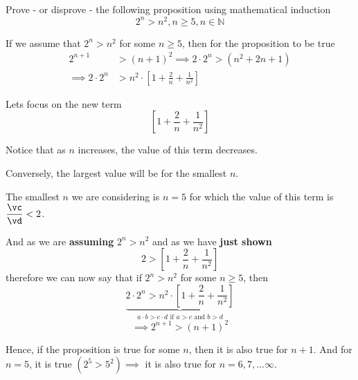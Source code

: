 
\question[3] Prove - or disprove - the following proposition using mathematical induction 
\[ 2^n > n^2, n\geq 5, n\in\mathbb{N} \]

\insertQR{}

\va\vb
\FRACADD\va{}\vc\vd

\begin{solution}[\halfpage]
  If we assume that  $2^n > n^2$ for some $n\geq 5$, then for the proposition to be true
  \begin{align}
    2^{n+1} &> (n+1)^2\implies 2\cdot 2^n > (n^2 + 2n + 1) \\
    \implies 2\cdot 2^n &> n^2\cdot\left[ 1 + \frac{2}{n} + \frac{1}{n^2} \right]
  \end{align}

  Lets focus on the new term 
  \[\left[ 1+\frac{2}{n}+\frac{1}{n^2} \right]\]

  Notice that as $n$ increases, the value of this term decreases. 

  Conversely, the largest value will be for the smallest $n$. 

  The smallest $n$ we are considering is $n=5$ for which the value of 
  this term is $\dfrac\vc\vd < 2$.

  And as we are \textbf{assuming} $2^n > n^2$ and as we have \textbf{just shown}
  \[ 2 > \left[ 1 + \frac{2}{n} + \frac{1}{n^2} \right] \]
  therefore we can now say that if $2^n > n^2$ for some $n\geq 5$, then
  \[ \underbrace{2\cdot 2^n > n^2\cdot\left[ 1 + \frac{2}{n} + \frac{1}{n^2} \right]}
  _{a\cdot b > c\cdot d\text{ if } a > c\text{ and } b > d }\]
  \[\implies 2^{n+1} > (n+1)^2\]

  Hence, if the proposition is true for some $n$, then it is also true for $n+1$. 
  And for $n=5$, it is true $(2^5>5^2)\implies$ it is also true for $n=6,7,\ldots\infty$.
  
\end{solution}

